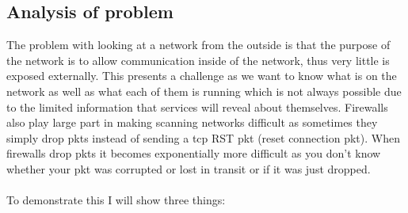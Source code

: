 \documentclass[titlepage]{article}
\let\Oldsubsection\subsection{}
\renewcommand{\subsection}{\FloatBarrier\Oldsubsection}
\begin{document}
\lstset{language=HTML}


\subsection{Analysis of problem}

The problem with looking at a network from the outside is that the purpose of the network is to
allow communication inside of the network, thus very little is exposed externally. This presents
a challenge as we want to know what is on the network as well as what each of them is running which
is not always possible due to the limited information that \glspl{service} will reveal about themselves.
Firewalls also play large part in making scanning networks difficult as sometimes they simply drop
\glspl{pkt} instead of sending a \gls{tcp} RST \gls{pkt} (reset connection \gls{pkt}).
When firewalls drop \glspl{pkt} it becomes exponentially more difficult as you don't know whether
your \gls{pkt} was corrupted or lost in transit or if it was just dropped. \\\\
To demonstrate this I will show three things:
\end{document}

